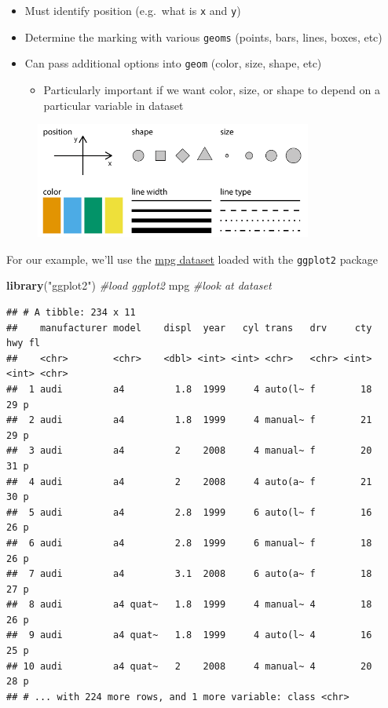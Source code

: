 \documentclass[]{book}
\newenvironment{Shaded}{\begin{snugshade}}{\end{snugshade}}
\newcommand{\KeywordTok}[1]{\textcolor[rgb]{0.13,0.29,0.53}{\textbf{#1}}}
\newcommand{\StringTok}[1]{\textcolor[rgb]{0.31,0.60,0.02}{#1}}
\newcommand{\CommentTok}[1]{\textcolor[rgb]{0.56,0.35,0.01}{\textit{#1}}}
\newcommand{\NormalTok}[1]{#1}
\providecommand{\tightlist}{%
  \setlength{\itemsep}{0pt}\setlength{\parskip}{0pt}}
\theoremstyle{definition}
\theoremstyle{definition}
\theoremstyle{definition}
\theoremstyle{remark}
\begin{document}
\begin{itemize}
  \begin{itemize}
  \tightlist
  \item
    Must identify position (e.g.~what is \texttt{x} and \texttt{y})
  \item
    Determine the marking with various \texttt{geoms} (points, bars,
    lines, boxes, etc)
  \item
    Can pass additional options into \texttt{geom} (color, size, shape,
    etc)

    \begin{itemize}
    \tightlist
    \item
      Particularly important if we want color, size, or shape to depend
      on a particular variable in dataset
    \end{itemize}
  \end{itemize}
\end{itemize}

\begin{figure}
\centering
\includegraphics[height=1.50000in]{images/ggplotaes.png}
\caption{}
\end{figure}

For our example, we'll use the
\href{https://ggplot2.tidyverse.org/reference/mpg.html}{mpg dataset}
loaded with the \texttt{ggplot2} package

\begin{Shaded}
\begin{Highlighting}[]
\KeywordTok{library}\NormalTok{(}\StringTok{"ggplot2"}\NormalTok{) }\CommentTok{#load ggplot2}
\NormalTok{mpg }\CommentTok{#look at dataset}
\end{Highlighting}
\end{Shaded}

\begin{verbatim}
## # A tibble: 234 x 11
##    manufacturer model    displ  year   cyl trans   drv     cty   hwy fl   
##    <chr>        <chr>    <dbl> <int> <int> <chr>   <chr> <int> <int> <chr>
##  1 audi         a4         1.8  1999     4 auto(l~ f        18    29 p    
##  2 audi         a4         1.8  1999     4 manual~ f        21    29 p    
##  3 audi         a4         2    2008     4 manual~ f        20    31 p    
##  4 audi         a4         2    2008     4 auto(a~ f        21    30 p    
##  5 audi         a4         2.8  1999     6 auto(l~ f        16    26 p    
##  6 audi         a4         2.8  1999     6 manual~ f        18    26 p    
##  7 audi         a4         3.1  2008     6 auto(a~ f        18    27 p    
##  8 audi         a4 quat~   1.8  1999     4 manual~ 4        18    26 p    
##  9 audi         a4 quat~   1.8  1999     4 auto(l~ 4        16    25 p    
## 10 audi         a4 quat~   2    2008     4 manual~ 4        20    28 p    
## # ... with 224 more rows, and 1 more variable: class <chr>
\end{verbatim}
\end{document}
